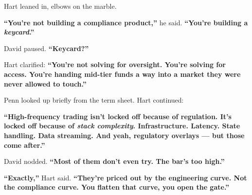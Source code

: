 Hart leaned in, elbows on the marble.

\textbf{``You’re not building a compliance product,''} he said. \textbf{``You’re building a \textit{keycard}.''}

David paused. \textbf{``Keycard?''}

Hart clarified:  
\textbf{``You’re not solving for oversight. You’re solving for \textbf{access}. You’re handing mid-tier funds a way into a market they were never allowed to touch.''}

Penn looked up briefly from the term sheet. Hart continued:

\textbf{``High-frequency trading isn’t locked off because of regulation. It’s locked off because of \textit{stack complexity}. Infrastructure. Latency. State handling. Data streaming. And yeah, regulatory overlays — but those come after.''}

David nodded. \textbf{``Most of them don’t even try. The bar’s too high.''}

\textbf{``Exactly,''} Hart said. \textbf{``They’re priced out by the engineering curve. Not the compliance curve. You flatten that curve, you open the gate.''}

\medskip

